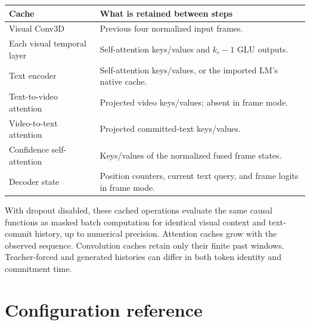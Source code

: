 \documentclass[11pt,a4paper]{article}
\numberwithin{equation}{section}
\begin{document}
\begin{center}
\small
\begin{tabularx}{\linewidth}{@{}l Y@{}}
\toprule
Cache & What is retained between steps \\
\midrule
Visual Conv3D & Previous four normalized input frames. \\
Each visual temporal layer & Self-attention keys/values and $k_c-1$ GLU outputs. \\
Text encoder & Self-attention keys/values, or the imported LM's native cache. \\
Text-to-video attention & Projected video keys/values; absent in frame mode. \\
Video-to-text attention & Projected committed-text keys/values. \\
Confidence self-attention & Keys/values of the normalized fused frame states. \\
Decoder state & Position counters, current text query, and frame logits in frame mode. \\
\bottomrule
\end{tabularx}
\end{center}

With dropout disabled, these cached operations evaluate the same causal
functions as masked batch computation for identical visual context and
text-commit history, up to numerical precision. Attention caches grow
with the observed sequence. Convolution caches retain only their finite
past windows. Teacher-forced and generated histories can differ in both
token identity and commitment time.

\section{Configuration reference}
\label{sec:configuration}
\end{document}
